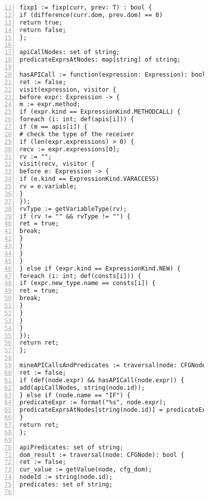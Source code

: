 \begin{figure}[ht!]
\begin{lstlisting}[numbers=left, tabsize=4, escapechar=@, caption={API Precondition Mining Analysis},label={lst:apm-code}, firstline = 11, firstnumber = 11, lastline = 59]
fixp1 := fixp(curr, prev: T) : bool {
if (difference(curr.dom, prev.dom) == 0)
return true;	
return false;
};

apiCallNodes: set of string;
predicateExprsAtNodes: map[string] of string;

hasAPICall := function(expression: Expression): bool {
ret := false;
visit(expression, visitor {
before expr: Expression -> {
m := expr.method;
if (expr.kind == ExpressionKind.METHODCALL) {
foreach (i: int; def(apis[i])) {
if (m == apis[i]) {
# check the type of the receiver
if (len(expr.expressions) > 0) {
recv := expr.expressions[0];
rv := "";
visit(recv, visitor {
before e: Expression -> {
if (e.kind == ExpressionKind.VARACCESS) 
rv = e.variable;
}
});
rvType := getVariableType(rv);
if (rv != "" && rvType != "") {
ret = true;
break;
}
}
}
} 
} else if (expr.kind == ExpressionKind.NEW) {
foreach (i: int; def(consts[i])) {
if (expr.new_type.name == consts[i]) {
ret = true;
break;
}
}
}
}
});
return ret;
};

mineAPICallsAndPredicates := traversal(node: CFGNode): bool { 
ret := false;
if (def(node.expr) && hasAPICall(node.expr)) {
add(apiCallNodes, string(node.id));
} else if (node.name == "IF") {
predicateExpr := format("%s", node.expr);
predicateExprsAtNodes[string(node.id)] = predicateExpr;
}
return ret;
};

apiPredicates: set of string;
dom_result := traversal(node: CFGNode): bool {
ret := false;
cur_value := getValue(node, cfg_dom);
nodeId := string(node.id);
predicates: set of string;


\end{lstlisting}
\end{figure}
